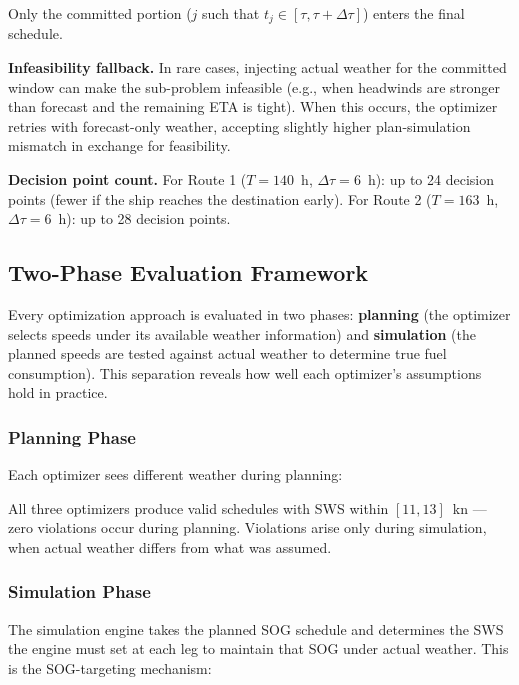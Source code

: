 \documentclass[review,authoryear]{elsarticle}  %
\begin{document}
Only the committed portion ($j$ such that $t_j \in [\tau, \tau + \Delta\tau]$) enters the final schedule.

\textbf{Infeasibility fallback.} In rare cases, injecting actual weather for the committed window can make the sub-problem infeasible (e.g., when headwinds are stronger than forecast and the remaining ETA is tight). When this occurs, the optimizer retries with forecast-only weather, accepting slightly higher plan-simulation mismatch in exchange for feasibility.

\textbf{Decision point count.} For Route 1 ($T = 140$~h, $\Delta\tau = 6$~h): up to 24 decision points (fewer if the ship reaches the destination early). For Route 2 ($T = 163$~h, $\Delta\tau = 6$~h): up to 28 decision points.

\subsection{Two-Phase Evaluation Framework}
\label{sec:two-phase}

Every optimization approach is evaluated in two phases: \textbf{planning} (the optimizer selects speeds under its available weather information) and \textbf{simulation} (the planned speeds are tested against actual weather to determine true fuel consumption). This separation reveals how well each optimizer's assumptions hold in practice.

\subsubsection{Planning Phase}

Each optimizer sees different weather during planning:


All three optimizers produce valid schedules with SWS within $[11, 13]$~kn --- zero violations occur during planning. Violations arise only during simulation, when actual weather differs from what was assumed.

\subsubsection{Simulation Phase}

The simulation engine takes the planned SOG schedule and determines the SWS the engine must set at each leg to maintain that SOG under actual weather. This is the SOG-targeting mechanism:
\end{document}
